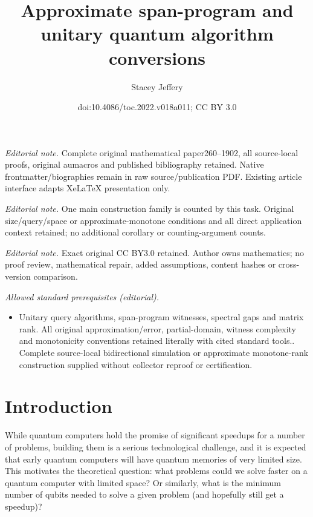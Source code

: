 \documentclass[11pt]{article}
\title{Approximate span-program and unitary quantum algorithm conversions}
\author{Stacey Jeffery}
\date{doi:10.4086/toc.2022.v018a011; CC BY 3.0}
\numberwithin{equation}{section}
\theoremstyle{definition}
\theoremstyle{plain}
\begin{document}
\maketitle
\noindent\textit{Editorial note.} Complete original mathematical paper260--1902, all source-local proofs, original aumacros and published bibliography retained. Native frontmatter/biographies remain in raw source/publication PDF. Existing article interface adapts XeLaTeX presentation only.\par\medskip
\noindent\textit{Editorial note.} One main construction family is counted by this task. Original size/query/space or approximate-monotone conditions and all direct application context retained; no additional corollary or counting-argument counts.\par\medskip
\noindent\textit{Editorial note.} Exact original CC BY3.0 retained. Author owns mathematics; no proof review, mathematical repair, added assumptions, content hashes or cross-version comparison.\par\medskip
\noindent\textit{Allowed standard prerequisites (editorial).}\begin{itemize}
\item Unitary query algorithms, span-program witnesses, spectral gaps and matrix rank. All original approximation/error, partial-domain, witness complexity and monotonicity conventions retained literally with cited standard tools.. Complete source-local bidirectional simulation or approximate monotone-rank construction supplied without collector reproof or certification.
\end{itemize}\medskip
\section{Introduction}

While quantum computers hold the promise of significant speedups for a number of problems, building them is a serious technological challenge, and it is expected that early quantum computers will have quantum memories of very limited size. This motivates the theoretical question: what problems could we solve faster on a quantum computer with limited space? Or similarly, what is the minimum number of qubits needed to solve a given problem (and hopefully still get a speedup)?  %
\end{document}
